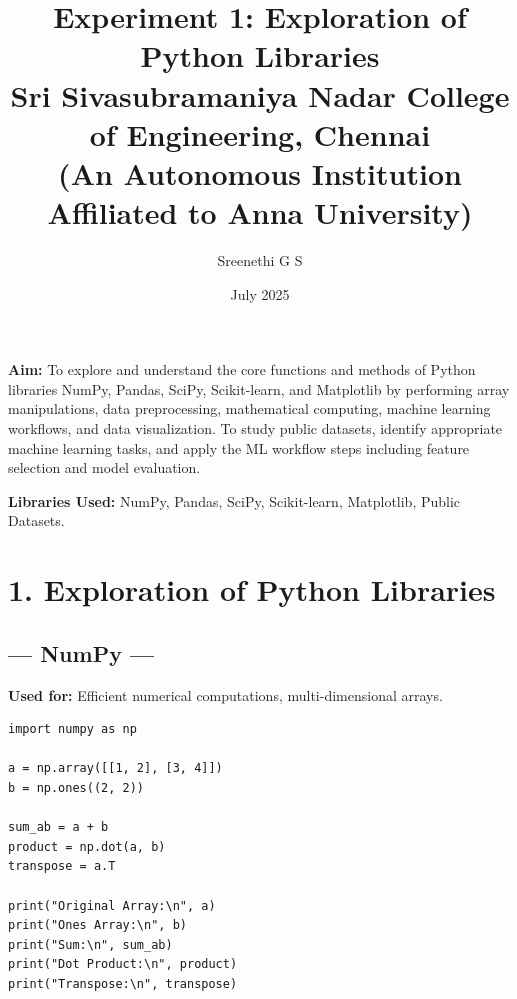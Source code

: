 \documentclass[11pt]{article}
\title{
    \textbf{Experiment 1: Exploration of Python Libraries} \\
    \large Sri Sivasubramaniya Nadar College of Engineering, Chennai \\
    \normalsize (An Autonomous Institution Affiliated to Anna University)
}
\author{Sreenethi G S}
\date{July 2025}
\begin{document}
\maketitle

\begin{table}[H]
\renewcommand{\arraystretch}{1.5}
\end{table}

\textbf{Aim:} To explore and understand the core functions and methods of Python libraries NumPy, Pandas, SciPy, Scikit-learn, and Matplotlib by performing array manipulations, data preprocessing, mathematical computing, machine learning workflows, and data visualization. To study public datasets, identify appropriate machine learning tasks, and apply the ML workflow steps including feature selection and model evaluation.

\vspace{0.3cm}
\textbf{Libraries Used:} NumPy, Pandas, SciPy, Scikit-learn, Matplotlib, Public Datasets.

\vspace{0.5cm}
\section*{1. Exploration of Python Libraries}

\subsection*{--- NumPy ---}
\textbf{Used for:} Efficient numerical computations, multi-dimensional arrays.
\begin{lstlisting}
import numpy as np

a = np.array([[1, 2], [3, 4]])
b = np.ones((2, 2))

sum_ab = a + b
product = np.dot(a, b)
transpose = a.T

print("Original Array:\n", a)
print("Ones Array:\n", b)
print("Sum:\n", sum_ab)
print("Dot Product:\n", product)
print("Transpose:\n", transpose)
\end{lstlisting}
\end{document}
